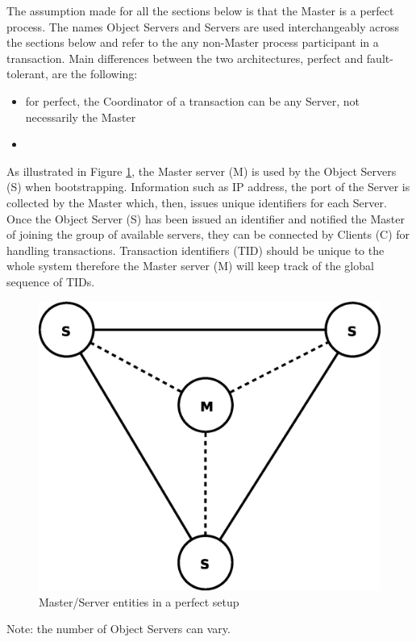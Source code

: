 \documentclass[times, 10pt,twocolumn]{article}
\begin{document}
\label{sec:arch}

The assumption made for all the sections below is that the Master is a perfect process. The names Object Servers and Servers are used interchangeably across the sections below and refer to the any non-Master process participant in a transaction.
Main differences between the two architectures, perfect and fault-tolerant, are the following:
\begin{itemize}[noitemsep,nolistsep]
\item for perfect, the Coordinator of a transaction can be any Server, not necessarily the Master
\item 
\end{itemize}
\label{subsec:perf}
As illustrated in Figure \ref{fig:perf}, the Master server (M) is used by the Object Servers (S) when bootstrapping. Information such as
IP address,  the port of the Server is collected by the Master which, then, issues unique identifiers for each Server. Once the Object Server (S) has been issued an identifier and notified the Master of joining the group of available servers, they can be connected by Clients (C) for handling transactions. Transaction identifiers (TID) should be unique to the whole system therefore the Master server (M) will keep track of the global sequence of TIDs.

\begin{figure}
\centering
\includegraphics[scale=0.3]{perfect.eps}
\caption{Master/Server entities in a perfect setup}
\label{fig:perf}
\end{figure}
Note: the number of Object Servers can vary.
\end{document}
